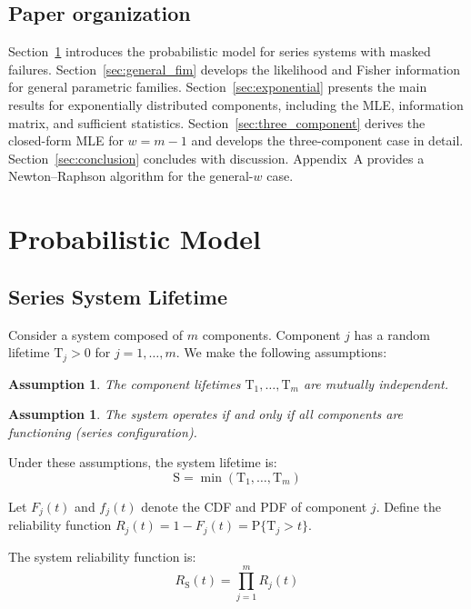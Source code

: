 \documentclass[pdflatex,sn-mathphys-num,Numbered]{sn-jnl}
\newcommand{\RV}[1]{\mathrm{#1}}
\newcommand{\Prob}[1]{\mathrm{P}\{#1\}}
\newcommand{\cv}{\RV{T}}           %
\newcommand{\sv}{\RV{S}}           %
\newcommand{\pdf}{f}
\newcommand{\cdf}{F}
\newcommand{\srv}{R}
\theoremstyle{thmstyleone}
\theoremstyle{thmstylethree}
\newtheorem{assumption}[theorem]{Assumption}
\theoremstyle{thmstyletwo}
\begin{document}
\subsection{Paper organization}

Section~\ref{sec:model} introduces the probabilistic model for series systems with masked failures. Section~\ref{sec:general_fim} develops the likelihood and Fisher information for general parametric families. Section~\ref{sec:exponential} presents the main results for exponentially distributed components, including the MLE, information matrix, and sufficient statistics. Section~\ref{sec:three_component} derives the closed-form MLE for $w = m-1$ and develops the three-component case in detail. Section~\ref{sec:conclusion} concludes with discussion. Appendix~A provides a Newton--Raphson algorithm for the general-$w$ case.

\section{Probabilistic Model}
\label{sec:model}

\subsection{Series System Lifetime}

Consider a system composed of $m$ components. Component $j$ has a random lifetime $\cv_j > 0$ for $j = 1, \ldots, m$. We make the following assumptions:

\begin{assumption}
\label{asm:indep}
The component lifetimes $\cv_1, \ldots, \cv_m$ are mutually independent.
\end{assumption}

\begin{assumption}
\label{asm:series}
The system operates if and only if all components are functioning (series configuration).
\end{assumption}

Under these assumptions, the system lifetime is:
\begin{equation}
\label{eq:system_lifetime}
\sv = \min(\cv_1, \ldots, \cv_m)
\end{equation}

Let $\cdf_j(t)$ and $\pdf_j(t)$ denote the CDF and PDF of component $j$. Define the reliability function $\srv_j(t) = 1 - \cdf_j(t) = \Prob{\cv_j > t}$.

The system reliability function is:
\begin{equation}
\label{eq:system_reliability}
\srv_{\sv}(t) = \prod_{j=1}^{m} \srv_j(t)
\end{equation}
\end{document}
